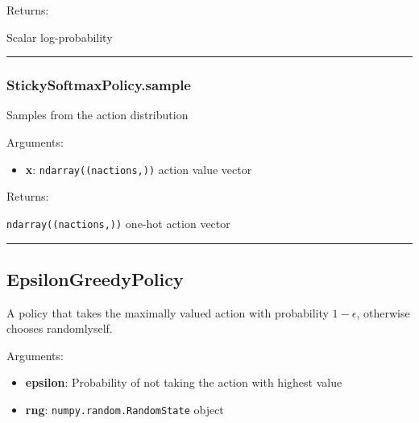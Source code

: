 Returns:

Scalar log-probability

\begin{center}\rule{0.5\linewidth}{\linethickness}\end{center}

\subsubsection{StickySoftmaxPolicy.sample}\label{stickysoftmaxpolicy.sample}

\begin{Shaded}
\begin{Highlighting}[]
\end{Highlighting}
\end{Shaded}

Samples from the action distribution

Arguments:

\begin{itemize}
\tightlist
\item
  \textbf{x}: \texttt{ndarray((nactions,))} action value vector
\end{itemize}

Returns:

\texttt{ndarray((nactions,))} one-hot action vector

\begin{center}\rule{0.5\linewidth}{\linethickness}\end{center}

\subsection{EpsilonGreedyPolicy}\label{epsilongreedypolicy}

\begin{Shaded}
\begin{Highlighting}[]
\end{Highlighting}
\end{Shaded}

A policy that takes the maximally valued action with probability
\(1-\epsilon\), otherwise chooses randomlyself.

Arguments:

\begin{itemize}
\tightlist
\item
  \textbf{epsilon}: Probability of not taking the action with highest
  value
\item
  \textbf{rng}: \texttt{numpy.random.RandomState} object
\end{itemize}

